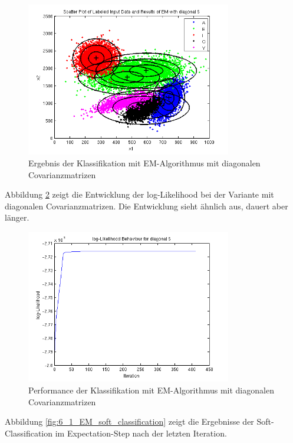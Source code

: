 \begin{figure}[h!]
  \centering
	\includegraphics[width=0.8\textwidth]{./figures/6_1_EM_classification_diag.png}
	\caption{Ergebnis der Klassifikation mit EM-Algorithmus mit diagonalen Covarianzmatrizen}
	\label{fig:6_1_EM_classification_diag}
\end{figure}

Abbildung \ref{fig:6_1_EM_performance_diag} zeigt die Entwicklung der log-Likelihood bei der Variante mit diagonalen Covarianzmatrizen. Die Entwicklung sieht ähnlich aus, dauert aber länger.

\begin{figure}[h!]
  \centering
	\includegraphics[width=0.8\textwidth]{./figures/6_1_EM_perf_diag.png}
	\caption{Performance der Klassifikation mit EM-Algorithmus mit diagonalen Covarianzmatrizen}
	\label{fig:6_1_EM_performance_diag}
\end{figure}

Abbildung \ref{fig:6_1_EM_soft_classification} zeigt die Ergebnisse der Soft-Classification im Expectation-Step nach der letzten Iteration.

